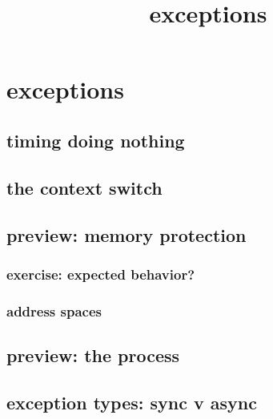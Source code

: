 \graphicspath{{./figures/}}
\title{exceptions}
\date{}

\begin{frame}
    \titlepage
\end{frame}


\section{exceptions}

\subsection{timing doing nothing}




\subsection{the context switch}


\subsection{preview: memory protection}
\subsubsection{exercise: expected behavior?}


\subsubsection{address spaces}



\subsection{preview: the process}


\subsection{exception types: sync v async}
%


